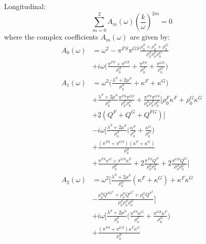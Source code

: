 \documentclass[twocolumn]{article}
\begin{document}
Longitudinal:
\begin{equation}
    \sum_{m = 0}^{2} A_m(\omega)\left(\frac{k}{\omega}\right)^{2m} = 0
\end{equation}
where the complex coefficients $A_m(\omega)$ are given by:
\begin{align*}
    A_0(\omega) & = \omega^2 - \pi^{FS}\pi^{GS}\frac{\rho_0^S + \rho_0^F + \rho_0^G}{\rho_0^S\rho_0^F\rho_0^G} \\
                & + i\omega\bigl(\frac{\pi^{FS} + \pi^{GS}}{\rho_0^S} + \frac{\pi^{FS}}{\rho_0^F}
    + \frac{\pi^{GS}}{\rho_0^G}\bigr)                                                                          \\
    A_1(\omega) & = \omega^2\bigl(\frac{\lambda^S + 2\mu^S}{\rho_0^S} + \kappa^F + \kappa^G\bigr)              \\
                & + \frac{\lambda^S + 2\mu^S}{\rho_0^S}\frac{\pi^{FS}\pi^{GS}}{\rho_0^F\rho_0^G}
    +\frac{\pi^{FS}\pi^{GS}}{\rho_0^S\rho_0^F\rho_0^G}
    [\rho_0^F\kappa^F + \rho_0^G\kappa^G                                                                       \\
                & + 2(Q^F + Q^G + Q^{FG})]                                                                     \\
                & -i\omega\bigl[\frac{\lambda^S + 2\mu^S}{\rho_0^S}
    \bigl(\frac{\kappa^F}{\rho_0^F}+\frac{\kappa^G}{\rho_0^G}\bigr)                                            \\
                & + \frac{(\pi^{FS}+\pi^{GS})(\kappa^F + \kappa^G)}{\rho_0^S}                                  \\
                & +\frac{\pi^{FS}\kappa^G + \pi^{GS}\kappa^F}{\rho_0^F}
    + 2\frac{\pi^{FS}Q^F}{\rho_0^S\rho_0^F} + 2\frac{\pi^{GS}Q^G}{\rho_0^S\rho_0^G}\bigr]                      \\
    A_2(\omega) & = \omega^2\bigl[\frac{\lambda^S + 2\mu^S}{\rho_0^S}(\kappa^F + \kappa^G)
    + \kappa^F\kappa^G                                                                                         \\
                & -\frac{\rho_0^SQ^{FG^2} + \rho_0^FQ^{G^2} + \rho_0^GQ^{F^2}}{\rho_0^S\rho_0^F\rho_0^G}\bigr] \\
                & +i\omega\bigl[\frac{\lambda^S + 2\mu^S}{\rho_0^S}
    \bigl(\frac{\pi^{FS}\kappa^G}{\rho_0^F} + \frac{\pi^{GS}\kappa^F}{\rho_0^G}\bigr)                          \\
                & +\frac{(\pi^{FS}+\pi^{GS})\kappa^F\kappa^G}{\rho_0^S}                                        \\

\end{align*}
\end{document}
